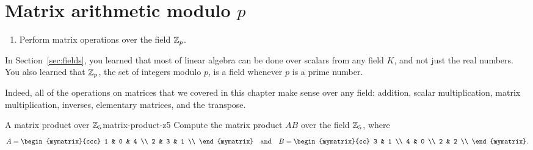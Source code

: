 \section{Matrix arithmetic modulo \texorpdfstring{$p$}{p}}

\begin{outcome}
  \begin{enumerate}
  \item Perform matrix operations over the field $\mathbb{Z}_p$.
  \end{enumerate}
\end{outcome}

In Section~\ref{sec:fields}, you learned that most of linear algebra
can be done over scalars from any field $K$, and not just the real
numbers. You also learned that $\mathbb{Z}_p$, the set of integers modulo $p$,
is a field whenever $p$ is a prime number.

Indeed, all of the operations on matrices that we covered in this
chapter make sense over any field: addition, scalar multiplication,
matrix multiplication, inverses, elementary matrices, and the
transpose.

\begin{example}{A matrix product over $\mathbb{Z}_5$}{matrix-product-z5}
  Compute the matrix product $AB$ over the field $\mathbb{Z}_5$, where
  \begin{equation*}
    A = \begin{mymatrix}{ccc}
      1 & 0 & 4 \\
      2 & 3 & 1 \\
    \end{mymatrix}
    \quad\mbox{and}\quad
    B = \begin{mymatrix}{cc}
      3 & 1 \\
      4 & 0 \\
      2 & 2 \\
    \end{mymatrix}.
  \end{equation*}
\end{example}

